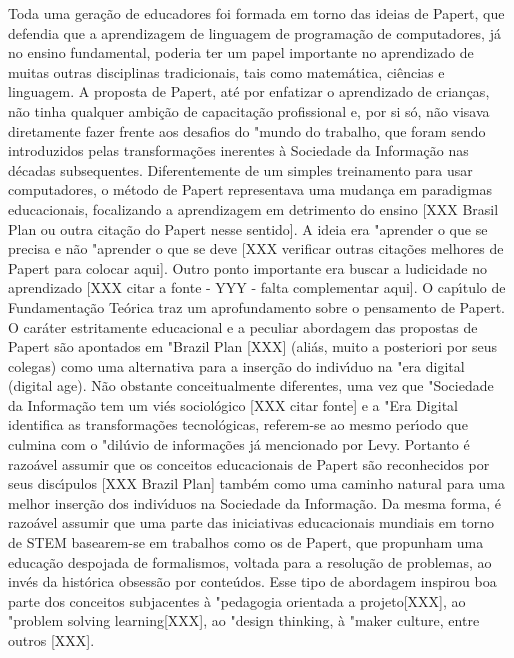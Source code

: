 \documentclass[
12pt,		%
openright,	%
twoside,  %
a4paper,			%
chapter=TITLE,		%
english,			%
french,				%
spanish,			%
brazil				%
]{USPSC-classe/USPSC}
\begin{document}
Toda uma gera\c{c}\~ao de educadores foi formada em torno das ideias de Papert, que defendia que a aprendizagem de linguagem de programa\c{c}\~ao de computadores, j\'a no ensino fundamental, poderia ter um papel importante no aprendizado de muitas outras disciplinas tradicionais, tais como matem\'atica, ci\^encias e linguagem. A proposta de Papert, at\'e por enfatizar o aprendizado de crian\c{c}as, n\~ao tinha qualquer ambi\c{c}\~ao de capacita\c{c}\~ao profissional e, por si s\'o, n\~ao visava diretamente fazer frente aos desafios do "mundo do trabalho, que foram sendo introduzidos pelas transforma\c{c}\~oes inerentes \`a Sociedade da Informa\c{c}\~ao nas d\'ecadas subsequentes. 
Diferentemente de um simples treinamento para usar computadores, o m\'etodo de Papert representava uma mudan\c{c}a em paradigmas educacionais, focalizando a aprendizagem em detrimento do ensino [XXX Brasil Plan ou outra cita\c{c}\~ao do Papert nesse sentido]. A ideia era "aprender o que se precisa e n\~ao "aprender o que se deve [XXX verificar outras cita\c{c}\~oes melhores de Papert para colocar aqui]. Outro ponto importante era buscar a ludicidade no aprendizado [XXX citar a fonte - YYY - falta complementar aqui]. O cap\'{\i}tulo de Fundamenta\c{c}\~ao Te\'orica traz um aprofundamento sobre o pensamento de Papert.
O car\'ater estritamente educacional e a peculiar abordagem das propostas de Papert s\~ao apontados em "Brazil Plan [XXX] (ali\'as, muito a posteriori por seus colegas) como uma alternativa para a inser\c{c}\~ao do indiv\'{\i}duo na "era digital (digital age). 
N\~ao obstante conceitualmente diferentes, uma vez que "Sociedade da Informa\c{c}\~ao tem um vi\'es sociol\'ogico [XXX citar fonte] e a "Era Digital identifica as transforma\c{c}\~oes tecnol\'ogicas, referem-se ao mesmo per\'{\i}odo que culmina com o "dil\'uvio de informa\c{c}\~oes j\'a mencionado por Levy. 
Portanto \'e razo\'avel assumir que os conceitos educacionais de Papert s\~ao reconhecidos por seus disc\'{\i}pulos [XXX Brazil Plan] tamb\'em como uma caminho natural para uma melhor inser\c{c}\~ao dos indiv\'{\i}duos na Sociedade da Informa\c{c}\~ao.
Da mesma forma, \'e razo\'avel assumir que uma parte das iniciativas educacionais mundiais em torno de STEM basearem-se em trabalhos como os de Papert, que propunham uma educa\c{c}\~ao despojada de formalismos, voltada para a resolu\c{c}\~ao de problemas, ao inv\'es da hist\'orica obsess\~ao por conte\'udos. Esse tipo de abordagem inspirou boa parte dos conceitos subjacentes \`a "pedagogia orientada a projeto[XXX], ao "problem solving learning[XXX], ao "design thinking, \`a "maker culture, entre outros [XXX].
\end{document}
